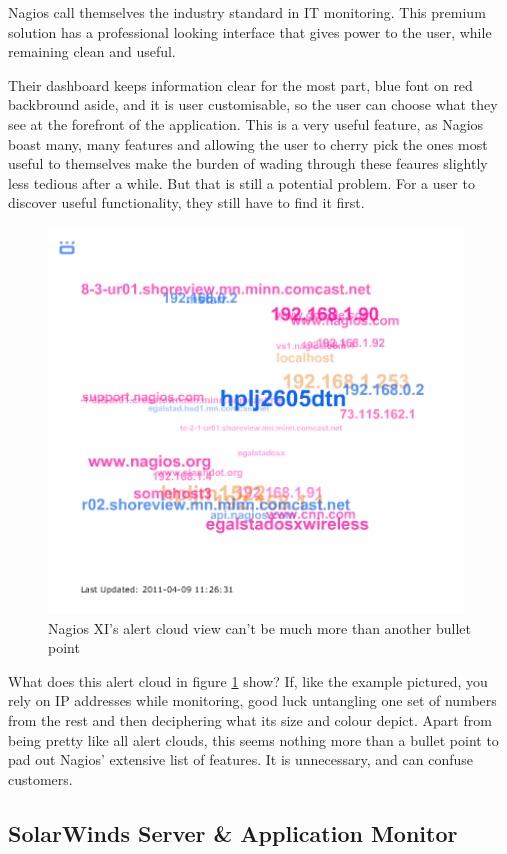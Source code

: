 \documentclass{l3proj}
\begin{document}
Nagios call themselves the industry standard in IT monitoring. This premium solution has a professional looking interface that gives power to the user, while remaining clean and useful.

Their dashboard keeps information clear for the most part, blue font on red backbround aside, and it is user customisable, so the user can choose what they see at the forefront of the application. This is a very useful feature, as Nagios boast many, many features and allowing the user to cherry pick the ones most useful to themselves make the burden of wading through these feaures slightly less tedious after a while. But that is still a potential problem. For a user to discover useful functionality, they still have to find it first.

\begin{figure}[H]
\centering
\includegraphics[width=110mm]{Competitors/NagiosXI_alertcloud.png}
\caption{Nagios XI's alert cloud view can't be much more than another bullet point}
\label{fig:NagiosAlertCloud}
\end{figure}

What does this alert cloud in figure \ref{fig:NagiosAlertCloud} show? If, like the example pictured, you rely on IP addresses while monitoring, good luck untangling one set of numbers from the rest and then deciphering what its size and colour depict. Apart from being pretty like all alert clouds, this seems nothing more than a bullet point to pad out Nagios' extensive list of features.  It is unnecessary, and can confuse customers.

\subsection{SolarWinds Server \& Application Monitor}
\end{document}
